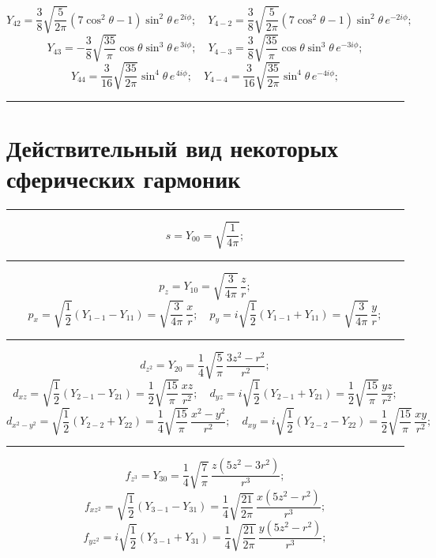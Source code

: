 \[\textit{Y}_{42}=\frac{3}{8}\sqrt{\frac{5}{2\pi}}\left(7\cos^2{\theta}-1 \right) \sin^2{\theta}\, e^{\,2i\phi};\quad \textit{Y}_{4-2}=\frac{3}{8}\sqrt{\frac{5}{2\pi}}\left(7\cos^2{\theta}-1 \right) \sin^2{\theta}\, e^{-2i\phi};
\]\hspace{\parindent}
\[\textit{Y}_{43}=-\frac{3}{8}\sqrt{\frac{35}{\pi}}\cos{\theta} \sin^3{\theta}\, e^{\,3i\phi};\quad \textit{Y}_{4-3}=\frac{3}{8}\sqrt{\frac{35}{\pi}}\cos{\theta} \sin^3{\theta}\, e^{-3i\phi};
\]\hspace{\parindent}
\[ \textit{Y}_{44}=\frac{3}{16}\sqrt{\frac{35}{2\pi}} \sin^4 {\theta} \, e^{\,4i\phi}; \quad
\textit{Y}_{4-4}=\frac{3}{16}\sqrt{\frac{35}{2\pi}} \sin^4 {\theta} \, e^{-4i\phi};
\]
\rule{\textwidth}{0.4pt}

\section{Действительный вид некоторых сферических гармоник}
\rule{\textwidth}{0.4pt}
\[ s=\textit{Y}_{00}=\sqrt{\frac{1}{4\pi}};\]
\rule{\textwidth}{0.4pt}
\[ p_z=\textit{Y}_{10}=\sqrt{\frac{3}{4\pi}}\,\frac{z}{r}; \]
\[p_x=\sqrt{\frac{1}{2}}\left(\textit{Y}_{1-1}-\textit{Y}_{11}\right)=\sqrt{\frac{3}{4\pi}}\,\frac{x}{r}; \quad p_y=i\sqrt{\frac{1}{2}}(\textit{Y}_{1-1}+\textit{Y}_{11})=\sqrt{\frac{3}{4\pi}}\,\frac{y}{r}; \]
\rule{\textwidth}{0.4pt}
\[ d_{z^2}=\textit{Y}_{20}=\frac{1}{4}\sqrt{\frac{5}{\pi}}\,\frac{3z^2-r^2}{r^2}; \]
\[d_{xz}=\sqrt{\frac{1}{2}}(\textit{Y}_{2-1}-\textit{Y}_{21})=\frac{1}{2}\sqrt{\frac{15}{\pi}}\,\frac{xz}{r^2}; \quad d_{yz}=i\sqrt{\frac{1}{2}}(\textit{Y}_{2-1}+\textit{Y}_{21})=\frac{1}{2}\sqrt{\frac{15}{\pi}}\,\frac{yz}{r^2}; \]\hspace{\parindent}
\[d_{x^2-y^2}=\sqrt{\frac{1}{2}}(\textit{Y}_{2-2}+\textit{Y}_{22})=\frac{1}{4}\sqrt{\frac{15}{\pi}}\,\frac{x^2-y^2}{r^2}; \quad d_{xy}=i\sqrt{\frac{1}{2}}(\textit{Y}_{2-2}-\textit{Y}_{22})=\frac{1}{2}\sqrt{\frac{15}{\pi}}\,\frac{xy}{r^2}; \]
\rule{\textwidth}{0.4pt}
\[ f_{z^3}=\textit{Y}_{30}=\frac{1}{4}\sqrt{\frac{7}{\pi}}\,\frac{z(5z^2-3r^2)}{r^3}; \]
\[f_{xz^2}=\sqrt{\frac{1}{2}}(\textit{Y}_{3-1}-\textit{Y}_{31})=\frac{1}{4}\sqrt{\frac{21}{2\pi}}\,\frac{x(5z^2-r^2)}{r^3}; \]\hspace{\parindent}
\[ f_{yz^2}=i\sqrt{\frac{1}{2}}(\textit{Y}_{3-1}+\textit{Y}_{31})=\frac{1}{4}\sqrt{\frac{21}{2\pi}}\,\frac{y(5z^2-r^2)}{r^3}; \]\hspace{\parindent}
